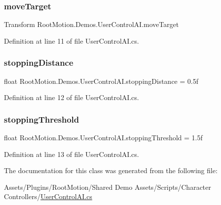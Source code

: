 \subsubsection{\texorpdfstring{move\+Target}{moveTarget}}
{\footnotesize\ttfamily Transform Root\+Motion.\+Demos.\+User\+Control\+A\+I.\+move\+Target}



Definition at line 11 of file User\+Control\+A\+I.\+cs.

\mbox{\label{class_root_motion_1_1_demos_1_1_user_control_a_i_abeb9b0990f17c3becf91d74972a1bb31}} 
\subsubsection{\texorpdfstring{stopping\+Distance}{stoppingDistance}}
{\footnotesize\ttfamily float Root\+Motion.\+Demos.\+User\+Control\+A\+I.\+stopping\+Distance = 0.\+5f}



Definition at line 12 of file User\+Control\+A\+I.\+cs.

\mbox{\label{class_root_motion_1_1_demos_1_1_user_control_a_i_aa01a8c5552bbc8987d78df5c4be7f576}} 
\subsubsection{\texorpdfstring{stopping\+Threshold}{stoppingThreshold}}
{\footnotesize\ttfamily float Root\+Motion.\+Demos.\+User\+Control\+A\+I.\+stopping\+Threshold = 1.\+5f}



Definition at line 13 of file User\+Control\+A\+I.\+cs.



The documentation for this class was generated from the following file\+:\begin{DoxyCompactItemize}
\item 
Assets/\+Plugins/\+Root\+Motion/\+Shared Demo Assets/\+Scripts/\+Character Controllers/\mbox{\hyperlink{_user_control_a_i_8cs}{User\+Control\+A\+I.\+cs}}\end{DoxyCompactItemize}
